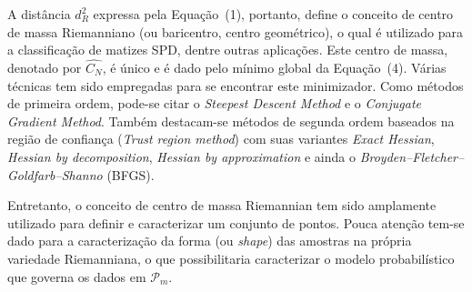 \documentclass[a4paper,titlepage]{article}
\begin{document}
\begin{center}
  \vspace{1em}
  \vspace{1em}
\end{center}

A distância $d^2_R$ expressa pela Equação~(1), portanto, define o conceito de
centro de massa Riemanniano (ou baricentro, centro geométrico), o qual é utilizado
para a classificação de matizes SPD, dentre outras aplicações. Este centro de
massa, denotado por $\hat{C_N}$, é único e é dado pelo mínimo global da
Equação~(4). Várias técnicas tem sido empregadas para se encontrar este
minimizador. Como métodos de primeira ordem, pode-se citar o \textit{Steepest
Descent Method} e o \textit{Conjugate Gradient Method}. Também destacam-se
métodos de segunda ordem baseados na região de confiança (\textit{Trust region
method}) com suas variantes \textit{Exact Hessian}, \textit{Hessian by
decomposition}, \textit{Hessian by approximation} e ainda o
\textit{Broyden–Fletcher–Goldfarb–Shanno} (BFGS).

Entretanto, o conceito de centro de massa Riemannian tem sido amplamente
utilizado para definir e caracterizar um conjunto de pontos. Pouca atenção
tem-se dado para a caracterização da forma (ou \textit{shape}) das amostras na
própria variedade Riemanniana, o que possibilitaria caracterizar o modelo
probabilístico que governa os dados em $\mathcal{P}_m$.
\end{document}
